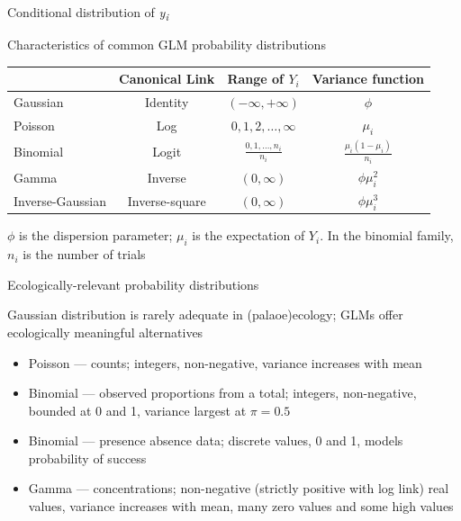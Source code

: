 \documentclass[10pt,ignorenonframetext,compress, aspectratio=169]{beamer}
\providecommand{\tightlist}{%
  \setlength{\itemsep}{0pt}\setlength{\parskip}{0pt}}
\begin{document}
\begin{frame}{Conditional distribution of \emph{y\textsubscript{i}}}

Characteristics of common GLM probability distributions

\begin{center}
    \begin{tabular}{lccc}
\hline
                 & Canonical Link & Range of $Y_i$               & Variance function              \\
\hline
Gaussian         & Identity       & $(-\infty, +\infty)$         & $\phi$                         \\
Poisson          & Log            & $0,1,2,\ldots,\infty$        & $\mu_i$                        \\
Binomial         & Logit          & $\frac{0,1,\ldots,n_i}{n_i}$ & $\frac{\mu_i(1 - \mu_i)}{n_i}$ \\
Gamma            & Inverse        & $(0, \infty)$                & $\phi \mu_i^2$                 \\
Inverse-Gaussian & Inverse-square & $(0, \infty)$                & $\phi \mu_i^3$                 \\
\hline
    \end{tabular}
\end{center}

\(\phi\) is the dispersion parameter; \(\mu_i\) is the expectation of
\(Y_i\). In the binomial family, \(n_i\) is the number of trials

\end{frame}

\begin{frame}{Ecologically-relevant probability distributions}

Gaussian distribution is rarely adequate in (palaoe)ecology; GLMs offer
ecologically meaningful alternatives

\begin{itemize}
\tightlist
\item
  \alert{Poisson} --- counts; integers, non-negative, variance increases
  with mean
\item
  \alert{Binomial} --- observed proportions from a total; integers,
  non-negative, bounded at 0 and 1, variance largest at \(\pi = 0.5\)
\item
  \alert{Binomial} --- presence absence data; discrete values, 0 and 1,
  models probability of success
\item
  \alert{Gamma} --- concentrations; non-negative (strictly positive with
  log link) real values, variance increases with mean, many zero values
  and some high values
\end{itemize}

\end{frame}
\end{document}
